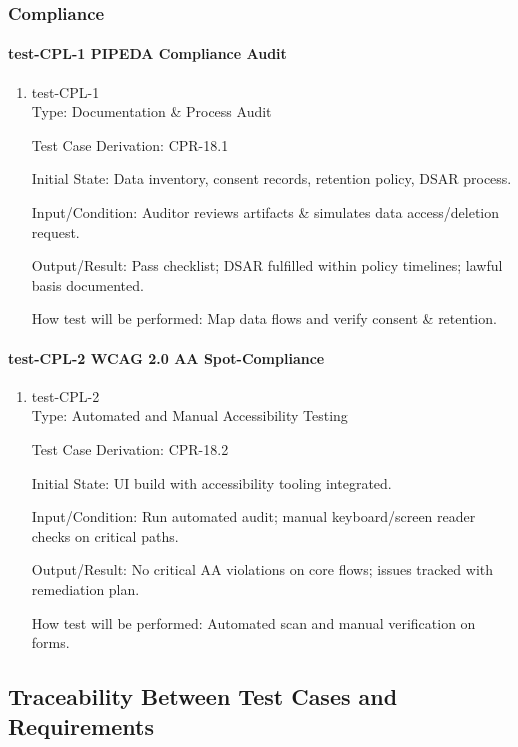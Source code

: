 \documentclass[12pt, titlepage]{article}
\begin{document}
\subsubsection{Compliance}

\paragraph{test-CPL-1 PIPEDA Compliance Audit}

\begin{enumerate}
\item{test-CPL-1\\}
Type: Documentation \& Process Audit

Test Case Derivation: CPR-18.1

Initial State: Data inventory, consent records, retention policy, DSAR process.

Input/Condition: Auditor reviews artifacts \& simulates data access/deletion request.

Output/Result: Pass checklist; DSAR fulfilled within policy timelines; lawful basis documented.

How test will be performed: Map data flows and verify consent \& retention.
\end{enumerate}

\paragraph{test-CPL-2 WCAG 2.0 AA Spot-Compliance}

\begin{enumerate}
\item{test-CPL-2\\}
Type: Automated and Manual Accessibility Testing

Test Case Derivation: CPR-18.2

Initial State: UI build with  accessibility tooling integrated.

Input/Condition: Run automated audit; manual keyboard/screen reader checks on critical paths.

Output/Result: No critical AA violations on core flows; issues tracked with remediation plan.

How test will be performed: Automated scan and manual verification on forms.
\end{enumerate}

\subsection{Traceability Between Test Cases and Requirements}
\end{document}
